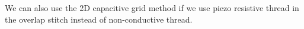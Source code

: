 We can also use the 2D capacitive grid method if we use piezo resistive thread in the overlap stitch instead of non-conductive thread.





